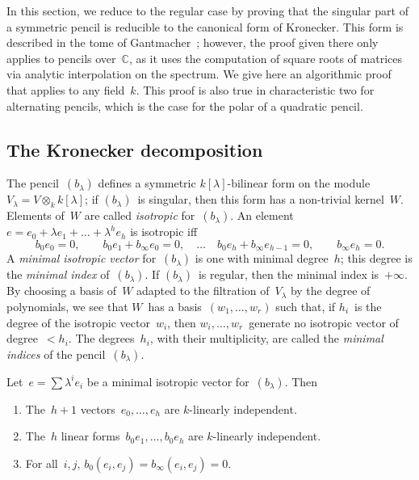 \documentclass{article}%
\begin{document}
In this section, we reduce to the regular case by proving that
the singular part of a symmetric pencil is reducible to
the canonical form of Kronecker.
This form is described in the tome of Gantmacher~\cite[XII(56)]{Gantmacher};
however, the proof given there only applies to pencils over~$ℂ$,
as it uses the computation of square roots of matrices
via analytic interpolation on the spectrum.
We give here an algorithmic proof that applies to any field~$k$.
This proof is also true in characteristic two for alternating pencils,
which is the case for the polar of a quadratic pencil.

\subsection{The Kronecker decomposition} %
\label{SS:Kronecker-reduction}
The pencil~$(b_{λ})$ defines a symmetric $k[λ]$-bilinear form on the
module~$V_{λ} = V ⊗_{k} k[λ]$; if $(b_{λ})$~is singular, then this form
has a non-trivial kernel~$W$. Elements of~$W$ are called \emph{isotropic}
for~$(b_{λ})$. An element~$e = e_0 + λ e_1 + … + λ^h e_h$ is isotropic iff
\begin{equation}\label{eq:isotropic}
b_0 e_0 = 0, \qquad
b_0 e_1 + b_{∞} e_0 = 0, \quad … \quad
b_0 e_h + b_{∞} e_{h-1} = 0, \qquad
b_{∞} e_{h} = 0.
\end{equation}
A \emph{minimal isotropic vector} for~$(b_{λ})$ is one with minimal
degree~$h$; this degree is the \emph{minimal index} of~$(b_{λ})$. If
$(b_{λ})$~is regular, then the minimal index is~$+∞$.
By choosing a basis of~$W$ adapted to
the filtration of~$V_{λ}$ by the degree of polynomials,
we see that $W$~has a basis~$(w_1, …,w_r)$ such that,
if $h_i$~is the degree of the isotropic vector~$w_i$,
then $w_i, …,w_r$~generate no isotropic vector of degree~$< h_i$.
The degrees~$h_i$, with their multiplicity,
are called the \emph{minimal indices} of the pencil~$(b_{λ})$.
\begin{prop}\label{prop:minimal-indep}%
Let~$e = ∑ λ^i e_i$ be a minimal isotropic vector for~$(b_{λ})$. Then
\begin{enumerate}
\item The~$h+1$ vectors~$e_0, …, e_h$ are $k$-linearly independent.
\item The~$h$ linear forms~$b_{0} e_1, …, b_{0} e_h$ are $k$-linearly
independent.
\item For all~$i, j$, $b_{0}(e_i, e_j) = b_{∞}(e_i, e_j) = 0$.
\end{enumerate}
\end{prop}
\end{document}
